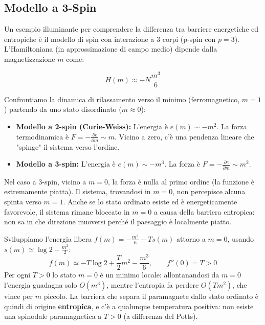 \subsection{Modello a 3-Spin}

Un esempio illuminante per comprendere la differenza tra barriere energetiche ed entropiche è il modello di spin con interazione a 3 corpi (p-spin con $p=3$).
L'Hamiltoniana (in approssimazione di campo medio) dipende dalla magnetizzazione $m$ come:

\begin{equation}
    H(m) \approx -N \frac{m^3}{6}
\end{equation}

Confrontiamo la dinamica di rilassamento verso il minimo (ferromagnetico, $m=1$) partendo da uno stato disordinato ($m \approx 0$):

\begin{itemize}
    \item \textbf{Modello a 2-spin (Curie-Weiss):} L'energia è $e(m) \sim -m^2$. La forza termodinamica è $F = -\frac{\partial e}{\partial m} \sim m$. Vicino a zero, c'è una pendenza lineare che "spinge" il sistema verso l'ordine.
    \item \textbf{Modello a 3-spin:} L'energia è $e(m) \sim -m^3$. La forza è $F = -\frac{\partial e}{\partial m} \sim m^2$.
\end{itemize}

Nel caso a 3-spin, vicino a $m=0$, la forza è nulla al primo ordine (la funzione è estremamente piatta). Il sistema, trovandosi in $m=0$, non percepisce alcuna spinta verso $m=1$. Anche se lo stato ordinato esiste ed è energeticamente favorevole, il sistema rimane bloccato in $m=0$ a causa della barriera entropica: non sa in che direzione muoversi perché il paesaggio è localmente piatto.

\begin{tcolorbox}[colback=yellow!25, colframe=yellow!75!orange, coltitle=black, title=\textbf{Il paramagnete del 3-spin è stabile a ogni $T>0$}]
Sviluppiamo l'energia libera $f(m) = -\frac{m^3}{6} - T s(m)$ attorno a $m=0$, usando $s(m) \simeq \log 2 - \frac{m^2}{2}$:
\begin{equation}
f(m) \simeq -T\log 2 + \frac{T}{2} m^2 - \frac{m^3}{6}, \qquad f''(0) = T > 0
\end{equation}
Per ogni $T > 0$ lo stato $m=0$ è un minimo locale: allontanandosi da $m=0$ l'energia guadagna solo $O(m^3)$, mentre l'entropia fa perdere $O(T m^2)$, che vince per $m$ piccolo. La barriera che separa il paramagnete dallo stato ordinato è quindi di origine \textbf{entropica}, e c'è a qualunque temperatura positiva: non esiste una spinodale paramagnetica a $T>0$ (a differenza del Potts).
\end{tcolorbox}

